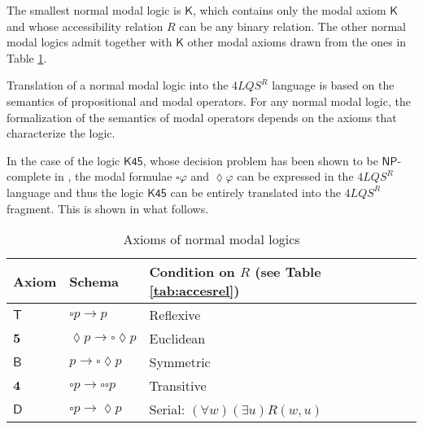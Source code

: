 \documentclass{fundam}
\newcommand{\K}{\mathsf{K}}
\newcommand{\T}{\mathsf{T}}
\newcommand{\Ac}{\mathbf{5}}
\newcommand{\B}{\mathsf{B}}
\newcommand{\Aq}{\mathbf{4}}
\newcommand{\D}{\mathsf{D}}
\newcommand{\Kqc}{\mathsf{K45}}
\newcommand{\QLQSR}{\ensuremath{\mbox{$4\mathit{LQS}^{R}$}}\xspace}
\begin{document}
The smallest normal modal logic is $\K$, which contains only the modal
axiom $\K$ and whose accessibility relation $R$ can be any binary
relation.  The other normal modal logics admit together with $\K$
other modal axioms drawn from the
ones in Table \ref{tab:modalax}.

Translation of a normal modal logic into the $\QLQSR$ language is
based on the semantics of propositional and modal operators. For any normal modal logic, the formalization of
the semantics of modal operators depends on the axioms that characterize the logic.

In the case of the logic $\Kqc$, whose decision problem has been shown
to be ${\mathsf{NP}}$-complete in \cite{Lad77}, the modal formulae
$\square\varphi$ and $\lozenge\varphi$ can be expressed in the
$\QLQSR$ language and thus the logic $\Kqc$ can be entirely translated
into the $\QLQSR$ fragment.  This is shown in what follows.


\begin{table}[tb]
\begin{center}
\begin{tabular}{|l|l|l|}
  \hline
Axiom & Schema & Condition on $R$ (see Table \ref{tab:accesrel}) \\\hline
$\T$  & $\square p \rightarrow p$ & Reflexive \\
$\Ac$ & $\lozenge p \rightarrow \square\lozenge p$ & Euclidean \\
$\B$  & $p \rightarrow \square\lozenge p$ & Symmetric \\
$\Aq$ & $\square p \rightarrow \square \square p$ & Transitive \\
$\D$  & $\square p \rightarrow \lozenge p$ & Serial: $(\forall w)(\exists u)R(w,u)$\\
\hline
\end{tabular}
\caption{\label{tab:modalax} Axioms of normal modal logics}
\end{center}
\end{table}
\end{document}
